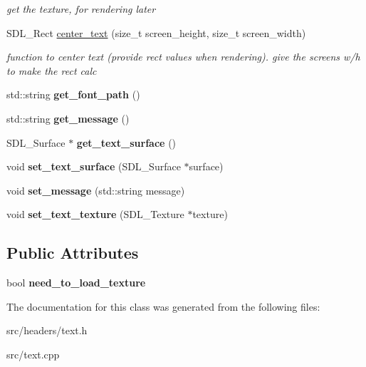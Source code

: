 \begin{DoxyCompactItemize}
\begin{DoxyCompactList}\small\item\em get the texture, for rendering later \end{DoxyCompactList}\item 
S\+D\+L\+\_\+\+Rect \hyperlink{classText_a61014e4523440c64103076fd4cd824eb}{center\+\_\+text} (size\+\_\+t screen\+\_\+height, size\+\_\+t screen\+\_\+width)\hypertarget{classText_a61014e4523440c64103076fd4cd824eb}{}\label{classText_a61014e4523440c64103076fd4cd824eb}

\begin{DoxyCompactList}\small\item\em function to center text (provide rect values when rendering). give the screen\textquotesingle{}s w/h to make the rect calc \end{DoxyCompactList}\item 
std\+::string {\bfseries get\+\_\+font\+\_\+path} ()\hypertarget{classText_a4a3ed0ce1dc44083cecd74928f68c9b9}{}\label{classText_a4a3ed0ce1dc44083cecd74928f68c9b9}

\item 
std\+::string {\bfseries get\+\_\+message} ()\hypertarget{classText_a3bcbed44873a5d3a6fecc5f4dd3956b0}{}\label{classText_a3bcbed44873a5d3a6fecc5f4dd3956b0}

\item 
S\+D\+L\+\_\+\+Surface $\ast$ {\bfseries get\+\_\+text\+\_\+surface} ()\hypertarget{classText_aa9362aac17dfdfe76f3a6276c82a2765}{}\label{classText_aa9362aac17dfdfe76f3a6276c82a2765}

\item 
void {\bfseries set\+\_\+text\+\_\+surface} (S\+D\+L\+\_\+\+Surface $\ast$surface)\hypertarget{classText_a10e1a33d49819cb1770bdaaa8ffd084c}{}\label{classText_a10e1a33d49819cb1770bdaaa8ffd084c}

\item 
void {\bfseries set\+\_\+message} (std\+::string message)\hypertarget{classText_ab00f846fa0e3f75918c37198fb58b04c}{}\label{classText_ab00f846fa0e3f75918c37198fb58b04c}

\item 
void {\bfseries set\+\_\+text\+\_\+texture} (S\+D\+L\+\_\+\+Texture $\ast$texture)\hypertarget{classText_a33c666aae2e2373d890a266d961125cd}{}\label{classText_a33c666aae2e2373d890a266d961125cd}

\end{DoxyCompactItemize}
\subsection*{Public Attributes}
\begin{DoxyCompactItemize}
\item 
bool {\bfseries need\+\_\+to\+\_\+load\+\_\+texture}\hypertarget{classText_a73c7da0ac348c550028335946986220a}{}\label{classText_a73c7da0ac348c550028335946986220a}

\end{DoxyCompactItemize}


The documentation for this class was generated from the following files\+:\begin{DoxyCompactItemize}
\item 
src/headers/text.\+h\item 
src/text.\+cpp\end{DoxyCompactItemize}
